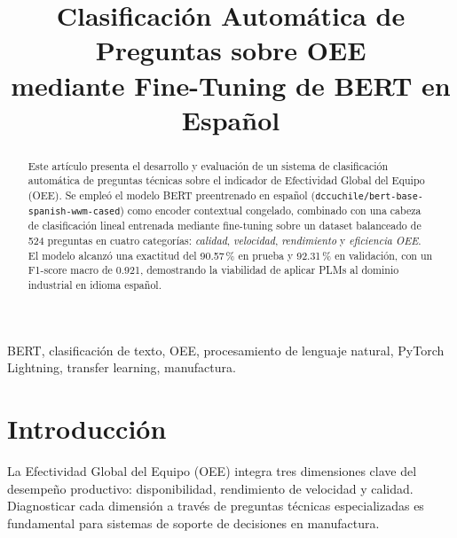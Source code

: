 \documentclass[conference]{IEEEtran}
\begin{document}
\title{Clasificación Automática de Preguntas sobre OEE\\
mediante Fine-Tuning de BERT en Español}

\author{
}

\maketitle

\begin{abstract}
Este artículo presenta el desarrollo y evaluación de un sistema de clasificación
automática de preguntas técnicas sobre el indicador de Efectividad Global del Equipo (OEE).
Se empleó el modelo BERT preentrenado en español
(\texttt{dccuchile/bert-base-spanish-wwm-cased}) como encoder contextual congelado,
combinado con una cabeza de clasificación lineal entrenada mediante fine-tuning
sobre un dataset balanceado de 524 preguntas en cuatro categorías:
\textit{calidad}, \textit{velocidad}, \textit{rendimiento} y \textit{eficiencia OEE}.
El modelo alcanzó una exactitud del 90.57\,\% en prueba y 92.31\,\% en validación,
con un F1-score macro de 0.921, demostrando la viabilidad de aplicar PLMs
al dominio industrial en idioma español.
\end{abstract}

\begin{IEEEkeywords}
BERT, clasificación de texto, OEE, procesamiento de lenguaje natural,
PyTorch Lightning, transfer learning, manufactura.
\end{IEEEkeywords}

\section{Introducción}

La Efectividad Global del Equipo (OEE) integra tres dimensiones clave del
desempeño productivo: disponibilidad, rendimiento de velocidad y calidad.
Diagnosticar cada dimensión a través de preguntas técnicas especializadas
es fundamental para sistemas de soporte de decisiones en manufactura.
\end{document}
